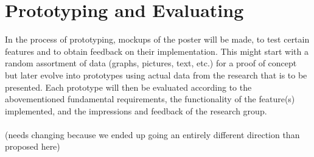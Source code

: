 \section{Prototyping and Evaluating}
In the process of prototyping, mockups of the poster will be made, to test certain features and to obtain feedback on their implementation. This might start with a random assortment of data (graphs, pictures, text, etc.) for a proof of concept but later evolve into prototypes using actual data from the research that is to be presented. Each prototype will then be evaluated according to the abovementioned fundamental requirements, the functionality of the feature(s) implemented, and the impressions and feedback of the research group.\\\\

(needs changing because we ended up going an entirely different direction than proposed here)

